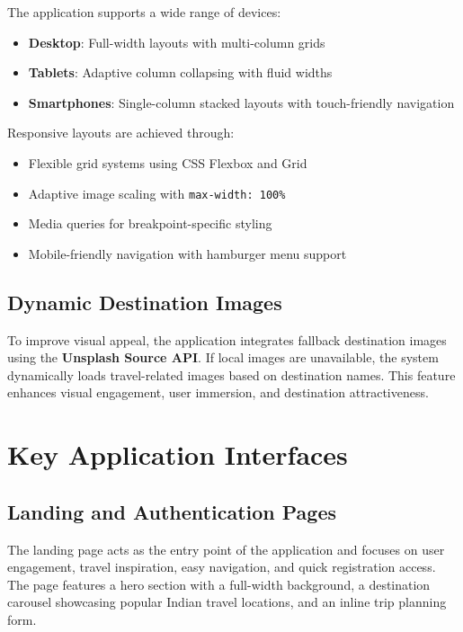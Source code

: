 The application supports a wide range of devices:

\begin{itemize}
    \item \textbf{Desktop}: Full-width layouts with multi-column grids
    \item \textbf{Tablets}: Adaptive column collapsing with fluid widths
    \item \textbf{Smartphones}: Single-column stacked layouts with touch-friendly navigation
\end{itemize}

Responsive layouts are achieved through:

\begin{itemize}
    \item Flexible grid systems using CSS Flexbox and Grid
    \item Adaptive image scaling with \texttt{max-width: 100\%}
    \item Media queries for breakpoint-specific styling
    \item Mobile-friendly navigation with hamburger menu support
\end{itemize}

\subsection{Dynamic Destination Images}

To improve visual appeal, the application integrates fallback destination images using the \textbf{Unsplash Source API}. If local images are unavailable, the system dynamically loads travel-related images based on destination names. This feature enhances visual engagement, user immersion, and destination attractiveness.

\section{Key Application Interfaces}

\subsection{Landing and Authentication Pages}

The landing page acts as the entry point of the application and focuses on user engagement, travel inspiration, easy navigation, and quick registration access. The page features a hero section with a full-width background, a destination carousel showcasing popular Indian travel locations, and an inline trip planning form.

